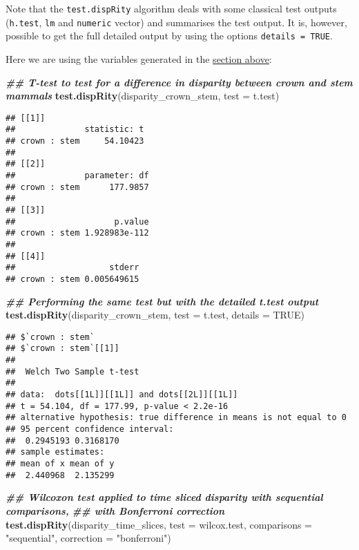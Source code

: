 \documentclass[
]{book}
\newenvironment{Shaded}{\begin{snugshade}}{\end{snugshade}}
\newcommand{\AttributeTok}[1]{\textcolor[rgb]{0.13,0.29,0.53}{#1}}
\newcommand{\ConstantTok}[1]{\textcolor[rgb]{0.56,0.35,0.01}{#1}}
\newcommand{\DocumentationTok}[1]{\textcolor[rgb]{0.56,0.35,0.01}{\textbf{\textit{#1}}}}
\newcommand{\FunctionTok}[1]{\textcolor[rgb]{0.13,0.29,0.53}{\textbf{#1}}}
\newcommand{\NormalTok}[1]{#1}
\newcommand{\StringTok}[1]{\textcolor[rgb]{0.31,0.60,0.02}{#1}}
\begin{document}
Note that the \texttt{test.dispRity} algorithm deals with some classical test outputs (\texttt{h.test}, \texttt{lm} and \texttt{numeric} vector) and summarises the test output.
It is, however, possible to get the full detailed output by using the options \texttt{details\ =\ TRUE}.

Here we are using the variables generated in the \protect\hyperlink{summarising-dispRity-data-plots}{section above}:

\begin{Shaded}
\begin{Highlighting}[]
\DocumentationTok{\#\# T{-}test to test for a difference in disparity between crown and stem mammals}
\FunctionTok{test.dispRity}\NormalTok{(disparity\_crown\_stem, }\AttributeTok{test =}\NormalTok{ t.test)}
\end{Highlighting}
\end{Shaded}

\begin{verbatim}
## [[1]]
##              statistic: t
## crown : stem     54.10423
## 
## [[2]]
##              parameter: df
## crown : stem      177.9857
## 
## [[3]]
##                    p.value
## crown : stem 1.928983e-112
## 
## [[4]]
##                   stderr
## crown : stem 0.005649615
\end{verbatim}

\begin{Shaded}
\begin{Highlighting}[]
\DocumentationTok{\#\# Performing the same test but with the detailed t.test output}
\FunctionTok{test.dispRity}\NormalTok{(disparity\_crown\_stem, }\AttributeTok{test =}\NormalTok{ t.test, }\AttributeTok{details =} \ConstantTok{TRUE}\NormalTok{)}
\end{Highlighting}
\end{Shaded}

\begin{verbatim}
## $`crown : stem`
## $`crown : stem`[[1]]
## 
##  Welch Two Sample t-test
## 
## data:  dots[[1L]][[1L]] and dots[[2L]][[1L]]
## t = 54.104, df = 177.99, p-value < 2.2e-16
## alternative hypothesis: true difference in means is not equal to 0
## 95 percent confidence interval:
##  0.2945193 0.3168170
## sample estimates:
## mean of x mean of y 
##  2.440968  2.135299
\end{verbatim}

\begin{Shaded}
\begin{Highlighting}[]
\DocumentationTok{\#\# Wilcoxon test applied to time sliced disparity with sequential comparisons,}
\DocumentationTok{\#\# with Bonferroni correction}
\FunctionTok{test.dispRity}\NormalTok{(disparity\_time\_slices, }\AttributeTok{test =}\NormalTok{ wilcox.test,}
              \AttributeTok{comparisons =} \StringTok{"sequential"}\NormalTok{, }\AttributeTok{correction =} \StringTok{"bonferroni"}\NormalTok{)}
\end{Highlighting}
\end{Shaded}
\end{document}
